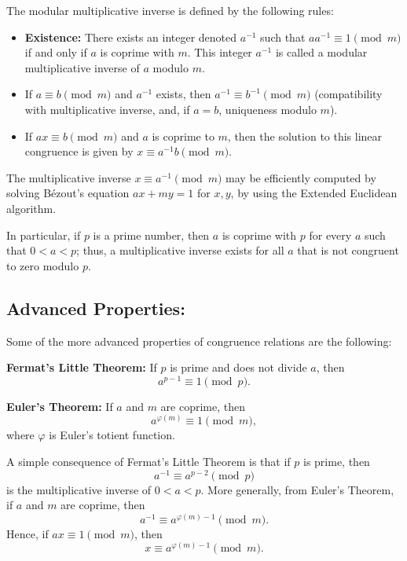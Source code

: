 The modular multiplicative inverse is defined by the following rules:

\begin{itemize}
    \item \textbf{Existence:} There exists an integer denoted \( a^{-1} \) such that \( a a^{-1} \equiv 1 \pmod{m} \) if and only if \( a \) is coprime with \( m \). This integer \( a^{-1} \) is called a modular multiplicative inverse of \( a \) modulo \( m \).
    \item If \( a \equiv b \pmod{m} \) and \( a^{-1} \) exists, then \( a^{-1} \equiv b^{-1} \pmod{m} \) (compatibility with multiplicative inverse, and, if \( a = b \), uniqueness modulo \( m \)).
    \item If \( ax \equiv b \pmod{m} \) and \( a \) is coprime to \( m \), then the solution to this linear congruence is given by \( x \equiv a^{-1} b \pmod{m} \).
\end{itemize}

The multiplicative inverse \( x \equiv a^{-1} \pmod{m} \) may be efficiently computed by solving Bézout's equation \( a x + m y = 1 \) for \( x, y \), by using the Extended Euclidean algorithm.

In particular, if \( p \) is a prime number, then \( a \) is coprime with \( p \) for every \( a \) such that \( 0 < a < p \); thus, a multiplicative inverse exists for all \( a \) that is not congruent to zero modulo \( p \).


\subsection{Advanced Properties:}
Some of the more advanced properties of congruence relations are the following:

\textbf{Fermat's Little Theorem:} If \( p \) is prime and does not divide \( a \), then
\[
a^{p-1} \equiv 1 \pmod{p}.
\]

\textbf{Euler's Theorem:} If \( a \) and \( m \) are coprime, then
\[
a^{\varphi(m)} \equiv 1 \pmod{m},
\]
where \( \varphi \) is Euler's totient function.

A simple consequence of Fermat's Little Theorem is that if \( p \) is prime, then
\[
a^{-1} \equiv a^{p-2} \pmod{p}
\]
is the multiplicative inverse of \( 0 < a < p \). More generally, from Euler's Theorem, if \( a \) and \( m \) are coprime, then
\[
a^{-1} \equiv a^{\varphi(m)-1} \pmod{m}.
\]
Hence, if \( ax \equiv 1 \pmod{m} \), then
\[
x \equiv a^{\varphi(m)-1} \pmod{m}.
\]

